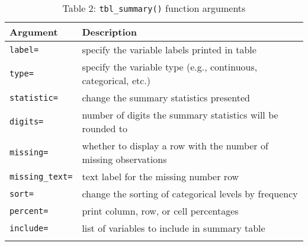 \captionsetup[table]{labelformat=empty,skip=1pt}
\begin{longtable}{ll}
\toprule
Argument & Description \\ 
\midrule
\texttt{label=} & specify the variable labels printed in table \\ 
\texttt{type=} & specify the variable type (e.g., continuous, categorical, etc.) \\ 
\texttt{statistic=} & change the summary statistics presented \\ 
\texttt{digits=} & number of digits the summary statistics will be rounded to \\ 
\texttt{missing=} & whether to display a row with the number of missing observations \\ 
\texttt{missing\_text=} & text label for the missing number row \\ 
\texttt{sort=} & change the sorting of categorical levels by frequency \\ 
\texttt{percent=} & print column, row, or cell percentages \\ 
\texttt{include=} & list of variables to include in summary table \\ 
\bottomrule\caption{Table 2: \texttt{tbl\_summary()} function arguments}\label{tab:caption}\\

\end{longtable}

